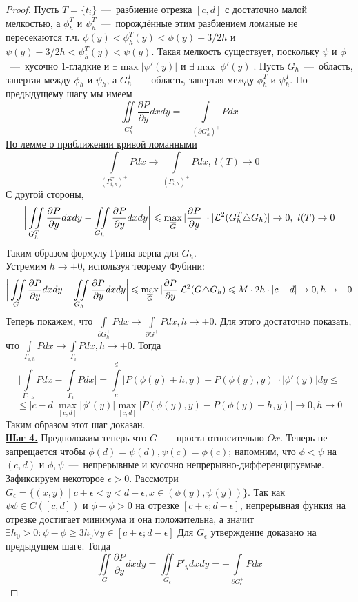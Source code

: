 \begin{proof}
        Пусть $T = \{t_i\}$~---~разбиение отрезка $[c, d]$ с достаточно малой мелкостью, а $\phi_h^T$ и $\psi_h^T$~---~порождённые этим разбиением ломаные не пересекаются т.ч. $\phi(y) < \phi_h^T(y) < \phi(y) + 3/2h$ и $\psi(y) - 3/2h < \psi_h^T(y) < \psi(y)$. Такая мелкость существует, поскольку $\psi$ и $\phi$~---~кусочно 1-гладкие и $\exists \max |\psi'(y)|$ и $\exists \max |\phi'(y)|$. Пусть $G_h$~---~область, запертая между $\phi_h$ и $\psi_h$, а $G_{h}^T$~---~область, запертая между $\phi_h^T$ и $\psi_h^T$. По предыдущему шагу мы имеем \[\iint\limits_{G_h^T} \dfrac{\partial P}{\partial y}dxdy = -\int\limits_{(\partial G_h^T)^+} Pdx\]
        \hyperlink{krivaya_lomanaya}{По лемме о приближении кривой ломанными}\[\int\limits_{(\Gamma_{i, h}^T)^+} Pdx \longrightarrow \int\limits_{(\Gamma_{i, h})^+}Pdx, \  l(T) \rightarrow 0\]
         С другой стороны, \[\biggr|\iint\limits_{G_h^T}\dfrac{\partial P}{\partial y} dxdy - \iint\limits_{G_h}\dfrac{\partial P}{\partial y}dxdy\biggr| \leqslant \max\limits_{\overline{G}}|\dfrac{\partial P}{\partial y}|\cdot |\mathcal{L}^2(G_h^T \triangle G_h)| \rightarrow 0, \  l(T) \rightarrow 0\]
        Таким образом формулу Грина верна для $G_h$. \\
        Устремим $h \rightarrow +0$, используя теорему Фубини:
        \[\biggr|\iint\limits_G \dfrac{\partial P}{\partial y} dxdy - \iint\limits_{G_h} \dfrac{\partial P}{\partial y} dxdy\biggr| \leqslant \max\limits_{\overline{G}} |\dfrac{\partial P}{\partial y}| \mathcal{L}^2(G \triangle G_h) \leqslant M \cdot 2h \cdot |c -d| \rightarrow 0, h \rightarrow +0\]
        Теперь покажем, что $\int\limits_{\partial G_h^+} Pdx \rightarrow \int\limits_{\partial G^+} Pdx, h \rightarrow +0$.
        Для этого достаточно показать, что $\int\limits_{\Gamma_{i, h}}Pdx \rightarrow \int\limits_{\Gamma_i} Pdx, h \rightarrow +0$.
        Тогда \[\biggr|\int\limits_{\Gamma_{1, h}}Pdx - \int\limits_{\Gamma_1}Pdx\biggr| = \int\limits_{c}^{d} |P(\phi(y) + h, y) - P(\phi(y), y)|\cdot|\phi'(y)|dy \leq \]\[ \leq |c - d|\max\limits_{[c, d]}|\phi'(y)| \max\limits_{[c, d]}|P(\phi(y), y) - P(\phi(y) + h, y)| \rightarrow 0, h \rightarrow 0\]
        Таким образом этот шаг доказан.\\
    \textbf{\underline{Шаг 4.}} Предположим теперь что $G$~---~проста относительно $Ox$. Теперь не запрещается чтобы $\phi(d) = \psi(d), \psi(c) = \phi(c)$; напомним, что $\phi < \psi$ на $(c, d)$ и $\phi, \psi$~---~непрерывные и кусочно непрерывно-дифференцируемые. Зафиксируем некоторое $\epsilon > 0$. Рассмотри $G_\epsilon = \{(x, y) \mid c + \epsilon < y < d - \epsilon, x \in (\phi(y), \psi(y))\}$. Так как $\psi \phi \in C([c, d])$ и $\phi - \phi > 0$ на отрезке $[c + \epsilon; d - \epsilon ]$, непрерывная функия на отрезке достигает минимума и она положительна, а значит $\exists h_0 > 0: \psi - \phi \geq 3h_0 \forall y \in [c + \epsilon; d - \epsilon ]$ Для $G_\epsilon$ утверждение доказано на предыдущем шаге. Тогда \[\iint\limits_G \dfrac{\partial P}{\partial y} dxdy = \iint\limits_{G_\epsilon} P'_ydxdy = -\int\limits_{\partial G_\epsilon^+} Pdx\]

\end{proof}
